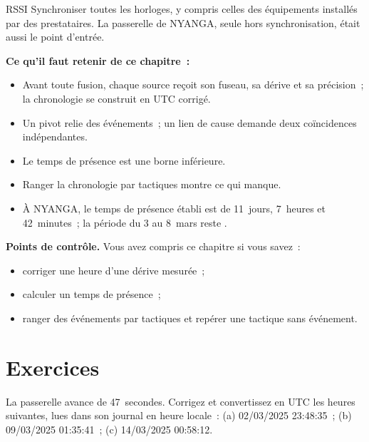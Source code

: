 \begin{boxmetier}{RSSI}
Synchroniser toutes les horloges, y compris celles des équipements installés
par des prestataires. La passerelle de NYANGA, seule hors synchronisation,
était aussi le point d'entrée.
\end{boxmetier}

\separateur

\begin{boxresume}
\textbf{Ce qu'il faut retenir de ce chapitre~:}
\begin{itemize}
    \item Avant toute fusion, chaque source reçoit son fuseau, sa dérive et
          sa précision~; la chronologie se construit en UTC corrigé.
    \item Un pivot relie des événements~; un lien de cause demande deux
          coïncidences indépendantes.
    \item Le temps de présence est une borne inférieure.
    \item Ranger la chronologie par tactiques montre ce qui manque.
    \item À NYANGA, le temps de présence établi est de 11~jours, 7~heures
          et 42~minutes~; la période du 3 au 8~mars reste \NEK{}.
\end{itemize}
\end{boxresume}

\begin{boxinfo}
\textbf{Points de contrôle.} Vous avez compris ce chapitre si vous savez~:
\begin{itemize}
    \item corriger une heure d'une dérive mesurée~;
    \item calculer un temps de présence~;
    \item ranger des événements par tactiques et repérer une tactique sans
          événement.
\end{itemize}
\end{boxinfo}

\section*{Exercices}

\begin{boxexo}[title={\ding{45}\quad Exercice~7.1. Corriger une heure \niveaubase}]
La passerelle avance de 47~secondes. Corrigez et convertissez en UTC les
heures suivantes, lues dans son journal en heure locale~: (a) 02/03/2025
23:48:35~; (b) 09/03/2025 01:35:41~; (c) 14/03/2025 00:58:12.
\end{boxexo}

